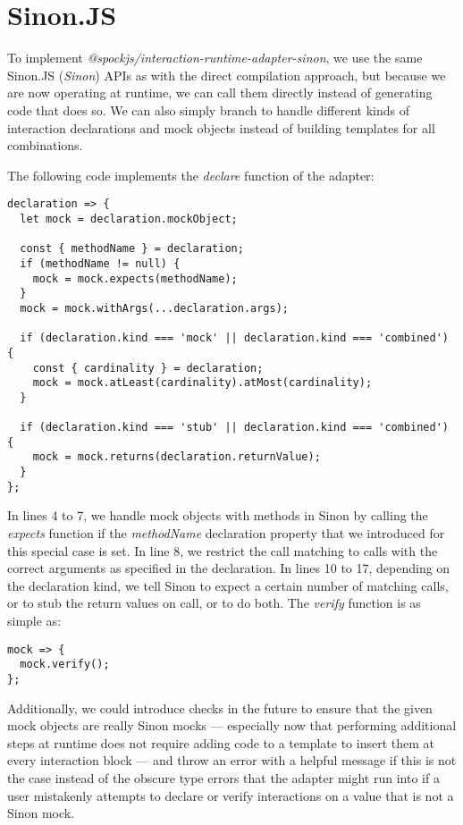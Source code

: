 \section{Sinon.JS}
To implement \textit{@spockjs/interaction-runtime-adapter-sinon},
we use the same Sinon.JS (\textit{Sinon}) APIs
as with the direct compilation approach,
but because we are now operating at runtime,
we can call them directly instead of generating code that does so.
We can also simply branch to handle
different kinds of interaction declarations and mock objects
instead of building templates for all combinations.

The following code implements the \textit{declare} function of the adapter:
\begin{verbatim}
declaration => {
  let mock = declaration.mockObject;

  const { methodName } = declaration;
  if (methodName != null) {
    mock = mock.expects(methodName);
  }
  mock = mock.withArgs(...declaration.args);

  if (declaration.kind === 'mock' || declaration.kind === 'combined') {
    const { cardinality } = declaration;
    mock = mock.atLeast(cardinality).atMost(cardinality);
  }

  if (declaration.kind === 'stub' || declaration.kind === 'combined') {
    mock = mock.returns(declaration.returnValue);
  }
};
\end{verbatim}
In lines 4 to 7, we handle mock objects with methods in Sinon
by calling the \textit{expects} function if
the \textit{methodName} declaration property
that we introduced for this special case is set.
In line 8, we restrict the call matching
to calls with the correct arguments as specified in the declaration.
In lines 10 to 17,
depending on the declaration kind,
we tell Sinon to expect a certain number of matching calls,
or to stub the return values on call, or to do both.
The \textit{verify} function is as simple as:
\begin{verbatim}
mock => {
  mock.verify();
};
\end{verbatim}

Additionally, we could introduce checks in the future to ensure
that the given mock objects are really Sinon mocks
--- especially now that performing additional steps at runtime
does not require adding code to a template to
insert them at every interaction block ---
and throw an error with a helpful message if this is not the case
instead of the obscure type errors that the adapter might run into
if a user mistakenly attempts to declare or verify interactions
on a value that is not a Sinon mock.
